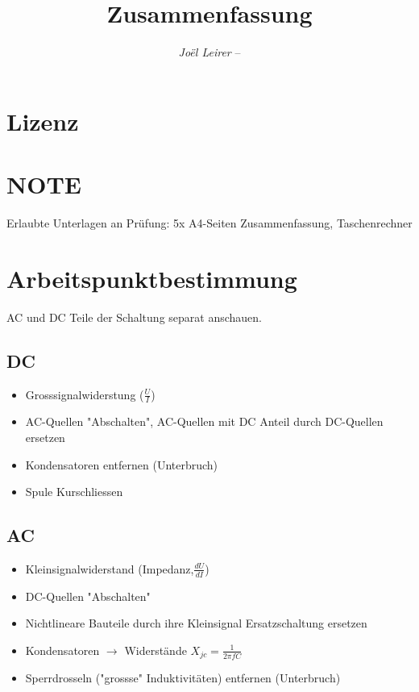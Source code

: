 \documentclass[margin=normal]{tex/hsrzf}
\author{\textsl{Joël Leirer} -- \texttt{\theauthoremail}}
\title{\texttt{\themodule} Zusammenfassung}
\date{\thesemester}
\begin{document}

\maketitle



\section*{Lizenz}
\doclicenseThis

\clearpage
\tableofcontents

\clearpage
\setcounter{page}{1}

\section*{NOTE}
Erlaubte Unterlagen an Prüfung: 5x A4-Seiten Zusammenfassung, Taschenrechner
\section{Arbeitspunktbestimmung}
AC und DC Teile der Schaltung separat anschauen.
\begin{multicols}{2}

  \subsection{DC}
  \begin{itemize}
    \item Grosssignalwiderstung ($\frac{U}{I}$)
    \item AC-Quellen "Abschalten", AC-Quellen mit DC Anteil durch DC-Quellen ersetzen
    \item Kondensatoren entfernen (Unterbruch)
    \item Spule Kurschliessen
  \end{itemize}
  \subsection{AC}
  \begin{itemize}
    \item Kleinsignalwiderstand (Impedanz,$\frac{dU}{dI}$)
    \item DC-Quellen "Abschalten"
    \item Nichtlineare Bauteile durch ihre Kleinsignal Ersatzschaltung ersetzen
    \item Kondensatoren $\to$ Widerstände $X_{jc}= \frac{1}{2\pi f C}$
    \item Sperrdrosseln ("grossse" Induktivitäten) entfernen (Unterbruch)
  \end{itemize}
\end{multicols}
\end{document}
